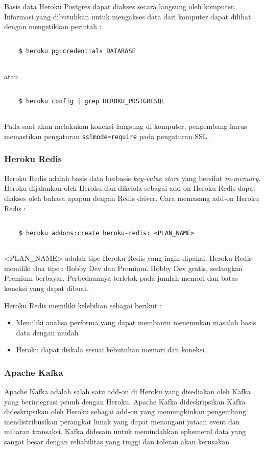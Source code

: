 Basis data Heroku Postgres dapat diakses secara langsung oleh komputer. Informasi yang dibutuhkan untuk mengakses data dari komputer dapat dilihat dengan mengetikkan perintah :
\begin{lstlisting}

	$ heroku pg:credentials DATABASE
	
\end{lstlisting}
atau
\begin{lstlisting}

	$ heroku config | grep HEROKU_POSTGRESQL
	
\end{lstlisting}
Pada saat akan melakukan koneksi langsung di komputer, pengembang harus memastikan pengaturan \texttt{sslmode=require} pada pengaturan SSL.

\subsubsection{Heroku Redis}
Heroku Redis adalah basis data berbasis \textit{key-value store} yang bersifat \textit{in-memory}. Heroku dijalankan oleh Heroku dan dikelola sebagai add-on Heroku Redis dapat diakses oleh bahasa apapun dengan Redis driver. Cara memasang add-on Heroku Redis :
\begin{lstlisting}
	
	$ heroku addons:create heroku-redis: <PLAN_NAME>
	
\end{lstlisting}
<PLAN\_NAME> adalah tipe Heroku Redis yang ingin dipakai. Heroku Redis memiliki dua tipe : Hobby Dev dan Premium. Hobby Dev gratis, sedangkan Premium berbayar. Perbedaannya terletak pada jumlah memori dan batas koneksi yang dapat dibuat.

Heroku Redis memiliki kelebihan sebagai berikut :
\begin{itemize}
\item Memiliki analisa performa yang dapat membantu menemukan masalah basis data dengan mudah
\item Heroku dapat diskala sesuai kebutuhan memori dan koneksi.
\end{itemize}

\subsubsection{Apache Kafka}
Apache Kafka adalah salah satu add-on di Heroku yang disediakan oleh Kafka yang berintegrasi penuh dengan Heroku. Apache Kafka dideskripsikan Kafka dideskripsikan oleh Heroku sebagai add-on yang memungkinkan pengembang mendistribusikan perangkat lunak yang dapat menangani jutaan event dan miliaran transaksi. Kafka didesain untuk memindahkan ephemeral data yang sangat besar dengan reliabilitas yang tinggi dan toleran akan kerusakan.

